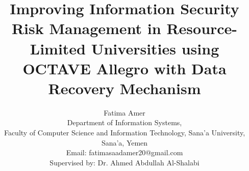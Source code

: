 \documentclass[journal,onecolumn,12pt,twoside]{IEEEtran}
\begin{document}
	
	
	\title{Improving Information Security Risk Management in Resource-Limited Universities using OCTAVE Allegro with Data Recovery Mechanism}
	
	\author{
		Fatima Amer\\
		\small Department of Information Systems,\\
		Faculty of Computer Science and Information Technology, Sana'a University, Sana'a, Yemen\\
		Email: fatimasaadamer20@gmail.com\\
		\vspace{0.3cm}
		Supervised by: Dr. Ahmed Abdullah Al-Shalabi
	}
	
	\maketitle
	
\end{document}
